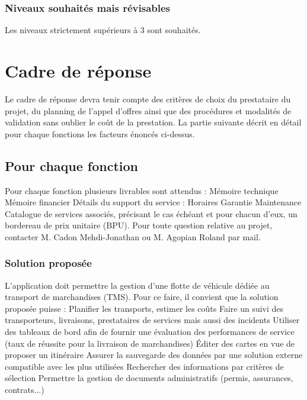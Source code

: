 \documentclass[11pt,fleqn]{book} %
\begin{document}
\subsection{Niveaux souhaités mais révisables}
Les niveaux strictement supérieurs à 3 sont souhaités.


\chapter{Cadre de réponse}
Le cadre de réponse devra tenir compte des critères de choix du prestataire du projet, du planning de l'appel d'offres ainsi que des procédures et modalités de validation sans oublier le coût de la prestation.
La partie suivante décrit en détail pour chaque fonctions les facteurs énoncés ci-dessus.

\section{Pour chaque fonction}
Pour chaque fonction plusieurs livrables sont attendus :
Mémoire technique
Mémoire financier
Détails du support du service :
Horaires
Garantie
Maintenance
Catalogue de services associés, précisant le cas échéant et pour chacun d'eux, un bordereau de prix unitaire (BPU).
Pour toute question relative au projet, contacter M. Cadon Mehdi-Jonathan ou M. Agopian Roland par mail.

\subsection{Solution proposée}
L'application doit permettre la gestion d'une flotte de véhicule dédiée au transport de marchandises (TMS).
Pour ce faire, il convient que la solution proposée puisse :
Planifier les transports, estimer les coûts
Faire un suivi des transporteurs, livraisons, prestataires de services mais aussi des incidents
Utiliser des tableaux de bord afin de fournir une évaluation des performances de service (taux  de réussite pour la livraison de marchandises)
Éditer des cartes en vue de proposer un itinéraire
Assurer la sauvegarde des données par une solution externe compatible avec les plus utilisées
Rechercher des informations par critères de sélection
Permettre la gestion de documents administratifs (permis, assurances, contrats...)
\end{document}
